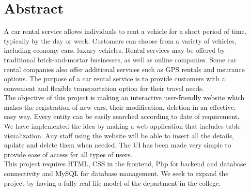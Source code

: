 \chapter*{Abstract}%
%


A car rental service allows individuals to rent a vehicle for a short period of time, typically by the day or week. Customers can choose from a variety of vehicles, including economy cars, luxury vehicles. Rental services may be offered by traditional brick-and-mortar businesses, as well as online companies. Some car rental companies also offer additional services such as GPS rentals and insurance options. The purpose of a car rental service is to provide customers with a convenient and flexible transportation option for their travel needs.\\
The objective of this project is making an interactive user-friendly website which makes the registration of new cars, their modification, deletion in an effective, easy way. Every entity can be easily searched according to date of requirement. We have implemented the idea by making a web application that includes table visualization. Any staff using the website will be able to insert all the details, update and delete them when needed. The UI has been made very simple to provide ease of access for all types of users.\\
This project requires HTML, CSS in the frontend, Php for backend and database connectivity and MySQL for database management. We seek to expand the project by having a fully real-life model of the department in the college. 
\thispagestyle{plain}

